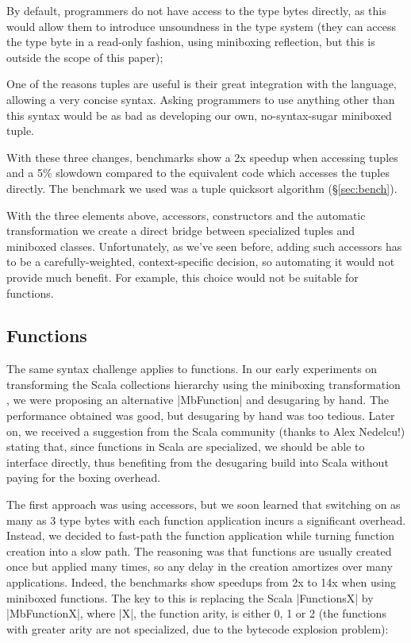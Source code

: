 \begin{compactitem}
 \item By default, programmers do not have access to the type bytes directly, as this would allow them to introduce unsoundness in the type system (they can access the type byte in a read-only fashion, using miniboxing reflection, but this is outside the scope of this paper);
 \item One of the reasons tuples are useful is their great integration with the language, allowing a very concise syntax. Asking programmers to use anything other than this syntax would be as bad as developing our own, no-syntax-sugar miniboxed tuple.
\end{compactitem}

With these three changes, benchmarks show a 2x speedup when accessing tuples and a 5\% slowdown compared to the equivalent code which accesses the tuples directly. The benchmark we used was a tuple quicksort algorithm (\S\ref{sec:bench}).

With the three elements above, accessors, constructors and the automatic transformation we create a direct bridge between specialized tuples and miniboxed classes. Unfortunately, as we've seen before, adding such accessors has to be a carefully-weighted, context-specific decision, so automating it would not provide much benefit. For example, this choice would not be suitable for functions.

\subsection{Functions}
\label{sec:functions}

The same syntax challenge applies to functions. In our early experiments on transforming the Scala collections hierarchy using the miniboxing transformation \cite{miniboxing-linkedlist}, we were proposing an alternative |MbFunction| and desugaring by hand. The performance obtained was good, but desugaring by hand was too tedious. Later on, we received a suggestion from the Scala community (thanks to Alex Nedelcu!) stating that, since functions in Scala are specialized, we should be able to interface directly, thus benefiting from the desugaring build into Scala without paying for the boxing overhead.

The first approach was using accessors, but we soon learned that switching on as many as 3 type bytes with each function application incurs a significant overhead. Instead, we decided to fast-path the function application while turning function creation into a slow path. The reasoning was that functions are usually created once but applied many times, so any delay in the creation amortizes over many applications. Indeed, the benchmarks show speedups from 2x to 14x when using miniboxed functions. The key to this is replacing the Scala |FunctionsX| by |MbFunctionX|, where |X|, the function arity, is either 0, 1 or 2 (the functions with greater arity are not specialized, due to the bytecode explosion problem):

